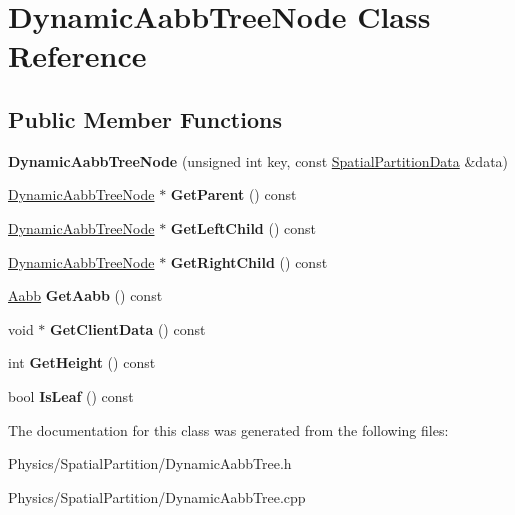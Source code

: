 \hypertarget{classDynamicAabbTreeNode}{}\section{Dynamic\+Aabb\+Tree\+Node Class Reference}
\label{classDynamicAabbTreeNode}
\subsection*{Public Member Functions}
\begin{DoxyCompactItemize}
\item 
\mbox{\label{classDynamicAabbTreeNode_a642f29ba18e5635f7c75ec00f4b0d8a1}} 
{\bfseries Dynamic\+Aabb\+Tree\+Node} (unsigned int key, const \hyperlink{classSpatialPartitionData}{Spatial\+Partition\+Data} \&data)
\item 
\mbox{\label{classDynamicAabbTreeNode_ad744f2b406abe153f6e4fc07f00d7b62}} 
\hyperlink{classDynamicAabbTreeNode}{Dynamic\+Aabb\+Tree\+Node} $\ast$ {\bfseries Get\+Parent} () const
\item 
\mbox{\label{classDynamicAabbTreeNode_a80c6ed32f3c5440f524ec38cdbf31a03}} 
\hyperlink{classDynamicAabbTreeNode}{Dynamic\+Aabb\+Tree\+Node} $\ast$ {\bfseries Get\+Left\+Child} () const
\item 
\mbox{\label{classDynamicAabbTreeNode_a0a1ff4b73424133fcd437a19ac77a320}} 
\hyperlink{classDynamicAabbTreeNode}{Dynamic\+Aabb\+Tree\+Node} $\ast$ {\bfseries Get\+Right\+Child} () const
\item 
\mbox{\label{classDynamicAabbTreeNode_a63dd9923f939cd475b90568a949e9831}} 
\hyperlink{classAabb}{Aabb} {\bfseries Get\+Aabb} () const
\item 
\mbox{\label{classDynamicAabbTreeNode_a9c1101785913748b9f5e64b0842425a5}} 
void $\ast$ {\bfseries Get\+Client\+Data} () const
\item 
\mbox{\label{classDynamicAabbTreeNode_ac36d17b0d2fe72b0cbfe513e54995ac2}} 
int {\bfseries Get\+Height} () const
\item 
\mbox{\label{classDynamicAabbTreeNode_acc87f07be4469f565cb57928b9f06c5a}} 
bool {\bfseries Is\+Leaf} () const
\end{DoxyCompactItemize}


The documentation for this class was generated from the following files\+:\begin{DoxyCompactItemize}
\item 
Physics/\+Spatial\+Partition/Dynamic\+Aabb\+Tree.\+h\item 
Physics/\+Spatial\+Partition/Dynamic\+Aabb\+Tree.\+cpp\end{DoxyCompactItemize}

